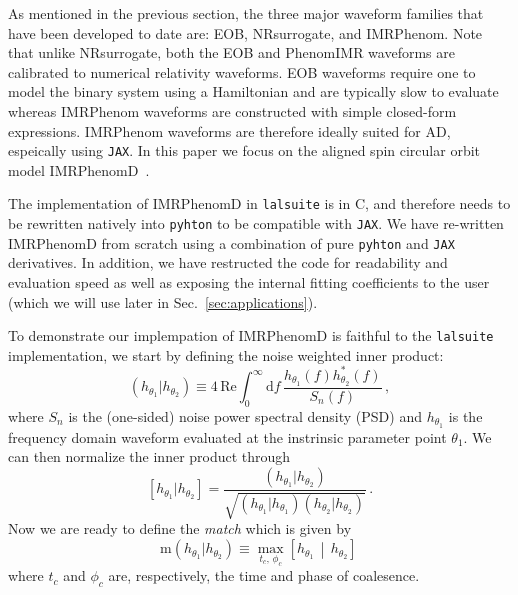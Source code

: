 \documentclass[twocolumn]{aastex631}
\newcommand{\jax}{\texttt{JAX}\xspace}
\newcommand{\lalsuite}{\texttt{lalsuite}\xspace}
\begin{document}
As mentioned in the previous section, the three major waveform families that have been developed to date are:  EOB,  NRsurrogate, and IMRPhenom.
Note that unlike NRsurrogate, both the EOB and PhenomIMR waveforms are calibrated to numerical relativity waveforms.
EOB waveforms require one to model the binary system using a Hamiltonian and are typically slow to evaluate whereas IMRPhenom waveforms are constructed with simple closed-form expressions.
IMRPhenom waveforms are therefore ideally suited for AD, espeically using \jax. 
In this paper we focus on the aligned spin circular orbit model IMRPhenomD~\citep{Husa:2015iqa, Khan:2015jqa}.

The implementation of IMRPhenomD in \lalsuite is in C, and therefore needs to be rewritten natively into \texttt{pyhton} to be compatible with \jax.
We have re-written IMRPhenomD from scratch using a combination of pure \texttt{pyhton} and \jax derivatives.
In addition, we have restructed the code for readability and evaluation speed as well as exposing the internal fitting coefficients to the user (which we will use later in Sec.~\ref{sec:applications}).

To demonstrate our implempation of IMRPhenomD is faithful to the \lalsuite implementation, we start by defining the noise weighted inner product:
\begin{equation}
    \label{eq:inner_prod}
    \left(h_{\theta_1}|h_{\theta_2}\right) \equiv 4 \, \mathrm{Re} \int^{\infty}_{0} \mathrm{d} f \, \frac{ h_{\theta_1}(f) h^*_{\theta_2}(f)}{S_n(f)}\, ,
\end{equation}
where $S_n$ is the (one-sided) noise power spectral density (PSD) and $h_{\theta_1}$ is the frequency domain waveform evaluated at the instrinsic parameter point $\theta_1$.
We can then normalize the inner product through
\begin{equation}
    \left[h_{\theta_1}|h_{\theta_2}\right] = \frac{\left(h_{\theta_1}|h_{\theta_2}\right)}{\sqrt{\left(h_{\theta_1}|h_{\theta_1}\right)\left(h_{\theta_2}|h_{\theta_2}\right)}}\, .
\end{equation}
Now we are ready to define the \textit{match} which is given by 
\begin{equation}
    \mathrm{m}(h_{\theta_1}|h_{\theta_2}) \equiv \max_{t_c,\, \phi_c} \left[h_{\theta_1} \, \middle| \, h_{\theta_2} \right]\,
\end{equation}
where $t_c$ and $\phi_c$ are, respectively, the time and phase of coalesence.
\end{document}
